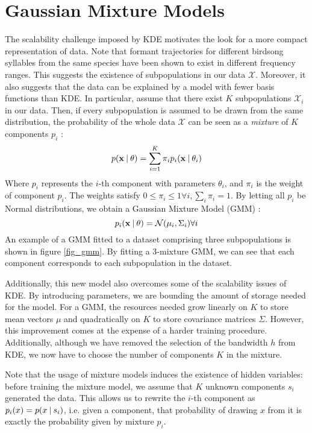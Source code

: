 \documentclass[../main.tex]{subfiles}
\begin{document}
\section{Gaussian Mixture Models}\label{subsection_gmm}
The scalability challenge imposed by KDE motivates the look for a more compact representation of data. Note that formant trajectories for different birdsong syllables from the same species have been shown to exist in different frequency ranges. This suggests the existence of subpopulations in our data $\mathcal{X}$. Moreover, it also suggests that the data can be explained by a model with fewer basis functions than KDE. In particular, assume that there exist $K$ subpopulations $\mathcal{X}_i$ in our data. Then, if every subpopulation is assumed to be drawn from the same distribution, the probability of the whole data $\mathcal{X}$ can be seen as a \emph{mixture} of $K$ components $p_i$ \cite{Murphy2012}:
\begin{equation} \label{eq:mixmod}
p(\mathbf{x} \:\vert\: \theta ) = \sum_{i=1}^K\pi_i p_i(\mathbf{x} \:\vert\: \theta_i)
\end{equation}
Where $p_i$ represents the $i$-th component with parameters $\theta_i$, and $\pi_i$ is the weight of component $p_i$. The weights satisfy $0 \leq \pi_i \leq 1 \forall i, \sum_i \pi_i = 1$. By letting all $p_i$ be Normal distributions, we obtain a Gaussian Mixture Model (GMM) \cite{Bishop2006}:
\begin{equation*} \label{eq:gmm}
p_i(\mathbf{x} \:\vert\: \theta) = \mathcal{N}(\mathbf{\mu}_i, \Sigma_i) \forall i
\end{equation*}
An example of a GMM fitted to a dataset comprising three subpopulations is shown in figure \ref{fig_gmm}. By fitting a 3-mixture GMM, we can see that each component corresponds to each subpopulation in the dataset.
\par Additionally, this new model also overcomes some of the scalability issues of KDE. By introducing parameters, we are bounding the amount of storage needed for the model. For a GMM, the resources needed grow linearly on $K$ to store mean vectors $\mu$ and quadratically on $K$ to store covariance matrices $\Sigma$. However, this improvement comes at the expense of a harder training procedure. Additionally, although we have removed the selection of the bandwidth $h$ from KDE, we now have to choose the number of components $K$ in the mixture.
\par Note that the usage of mixture models induces the existence of hidden variables: before training the mixture model, we assume that $K$ unknown components $s_i$ generated the data. This allows us to rewrite the $i$-th component as $p_i(x) = p(x \:\vert\: s_i)$, i.e. given a component, that probability of drawing $x$ from it is exactly the probability given by mixture $p_i$. 
\end{document}
